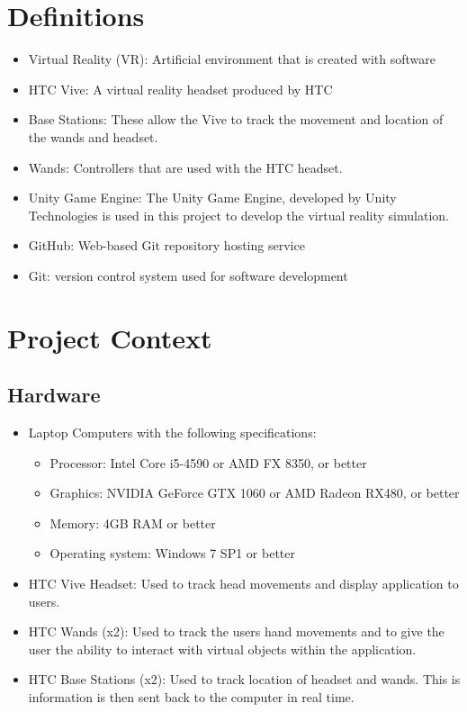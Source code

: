 \documentclass[10pt,journal,compsoc,onecolumn, draftclsnofoot]{IEEEtran}
\begin{document}
\section{Definitions}
\begin{itemize}
  \item Virtual Reality (VR):  Artificial environment that is created with software
  \item HTC Vive: A virtual reality headset produced by HTC
  \item Base Stations: These allow the Vive to track the movement and location of the wands and headset.
  \item Wands: Controllers that are used with the HTC headset.
  \item Unity Game Engine: The Unity Game Engine, developed by Unity Technologies is used in this project to develop the virtual reality simulation.
  \item GitHub: Web-based Git repository hosting service
  \item Git: version control system used for software development
\end{itemize}


\section{Project Context}
\subsection{Hardware}
\begin{itemize}
  \item Laptop Computers with the following specifications:
  \begin{itemize}
    \item Processor: Intel Core i5-4590 or AMD FX 8350, or better
    \item Graphics: NVIDIA GeForce GTX 1060 or AMD Radeon RX480, or better
    \item Memory: 4GB RAM or better
    \item Operating system: Windows 7 SP1 or better
  \end{itemize}
  \item HTC Vive Headset: Used to track head movements and display application to users.
  \item HTC Wands (x2): Used to track the users hand movements and to give the user the ability to interact with virtual objects within the application.
  \item HTC Base Stations (x2): Used to track location of headset and wands. This is information is then sent back to the computer in real time.
\end{itemize}
\end{document}
